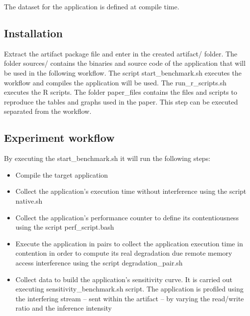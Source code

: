 \documentclass{sigplanconf}
\begin{document}
	The dataset for the application is defined at compile time.
	
	\subsection{Installation} 
	
	Extract the artifact package file and enter in the created \textsf{artifact/} folder.  The
	folder \textsf{sources/} contains the binaries and source code of the application that
	will be used in the following workflow. The script \textsf{start\_benchmark.sh} executes
	the workflow and compiles the application will be used. The \textsf{run\_r\_scripts.sh}
	executes the R scripts. The folder \textsf{paper\_files} contains the files and scripts to
	reproduce the tables and graphs used in the paper. This step can be executed separated
	from the workflow.
	
	\subsection{Experiment workflow} 
	
	By executing the \textsf{start\_benchmark.sh} it will run the following steps: 
	
	\begin{itemize} 
		
		\item Compile the target application
		
		\item Collect the application's execution time without interference using the script
		\textsf{native.sh}
		
		\item Collect the application's performance counter to define its contentiousness
		using the script \textsf{perf\_script.bash}
		
		\item Execute the application in pairs to collect the application execution time in
		contention in order to compute its real degradation due remote memory access
		interference using the script \textsf{degradation\_pair.sh}
		
		\item Collect data to build the application's sensitivity curve. It is carried out
		executing \textsf{sensitivity\_benchmark.sh} script. The application is profiled
		using the interfering stream -- sent within the artifact
		-- by varying the read/write ratio and the inference intensity
		
	\end{itemize} 
	
\end{document}
